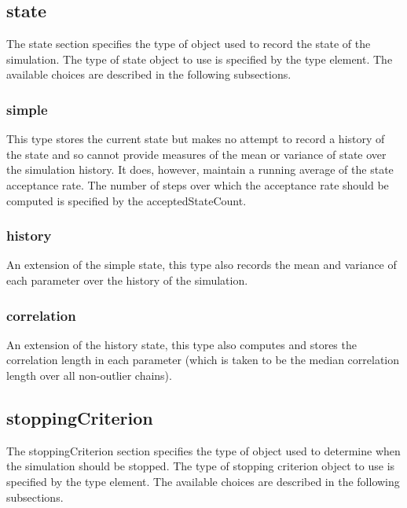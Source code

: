 \subsection{{\normalfont \ttfamily state}}

The {\normalfont \ttfamily state} section specifies the type of object used to record the state of the simulation. The type of state object to use is specified by the {\normalfont \ttfamily type} element. The available choices are described in the following subsections.

\subsubsection{{\normalfont \ttfamily simple}}

This type stores the current state but makes no attempt to record a history of the state and so cannot provide measures of the mean or variance of state over the simulation history. It does, however, maintain a running average of the state acceptance rate. The number of steps over which the acceptance rate should be computed is specified by the {\normalfont \ttfamily acceptedStateCount}.

\subsubsection{{\normalfont \ttfamily history}}

An extension of the {\normalfont \ttfamily simple} state, this type also records the mean and variance of each parameter over the history of the simulation.

\subsubsection{{\normalfont \ttfamily correlation}}

An extension of the {\normalfont \ttfamily history} state, this type also computes and stores the correlation length in each parameter (which is taken to be the median correlation length over all non-outlier chains).

\subsection{{\normalfont \ttfamily stoppingCriterion}}

The {\normalfont \ttfamily stoppingCriterion} section specifies the type of object used to determine when the simulation should be stopped. The type of stopping criterion object to use is specified by the {\normalfont \ttfamily type} element. The available choices are described in the following subsections.

